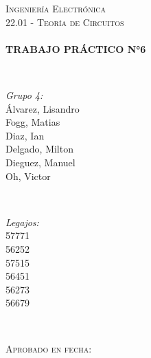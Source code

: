 \begin{titlepage}
\textsc{\Large Ingeniería Electrónica }\\[0.3cm]
\textsc{\large 22.01 - Teoría de Circuitos}\\[0.5cm] %


\HRule \\[0.4cm]
{ \huge \bfseries TRABAJO PRÁCTICO N°6\\ [0.3cm]}

\HRule \\[1.5cm]

 

\begin{minipage}{0.4\textwidth}
\begin{flushleft} \large
\emph{Grupo 4:}\\
Álvarez, Lisandro \\Fogg, Matias\\ Diaz, Ian\\Delgado, Milton\\Dieguez, Manuel\\Oh, Victor %
\end{flushleft}
\end{minipage}
~
\begin{minipage}{0.4\textwidth}
\begin{flushright} \large
\emph{Legajos:} \\
57771\\56252\\57515\\56451\\56273\\56679 
\end{flushright}
\end{minipage}\\[1cm]


 \begin{flushleft}
\textsc{\large Aprobado en fecha:  \dotfill}\\[0.5cm] 




\end{flushleft}
\end{titlepage}

